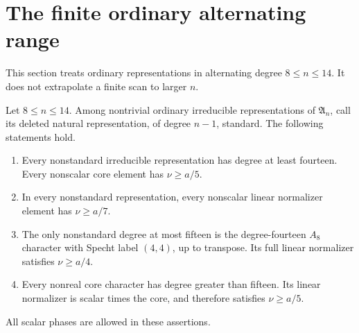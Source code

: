 \section{The finite ordinary alternating range}
\label{sec:ordinary-alternating-small}

This section treats ordinary representations in alternating degree
$8\le n\le14$.  It does not extrapolate a finite scan to larger $n$.

\begin{lemma}
\label{HD-ALT-02a}
Let $8\le n\le14$.  Among nontrivial ordinary irreducible representations of
$\mathfrak A_n$, call its deleted natural representation, of degree
$n-1$, standard.  The following statements hold.
\begin{enumerate}
\item Every nonstandard irreducible representation has degree at
least fourteen.  Every nonscalar core element has $\nu\ge a/5$.
\item In every nonstandard representation, every nonscalar linear
normalizer element has $\nu\ge a/7$.
\item The only nonstandard degree at most fifteen is the degree-fourteen
$A_8$ character with Specht label $(4,4)$, up to transpose.  Its full
linear normalizer satisfies $\nu\ge a/4$.
\item Every nonreal core character has degree greater than fifteen.
Its linear normalizer is scalar times the core, and therefore satisfies
$\nu\ge a/5$.
\end{enumerate}
All scalar phases are allowed in these assertions.
\end{lemma}


